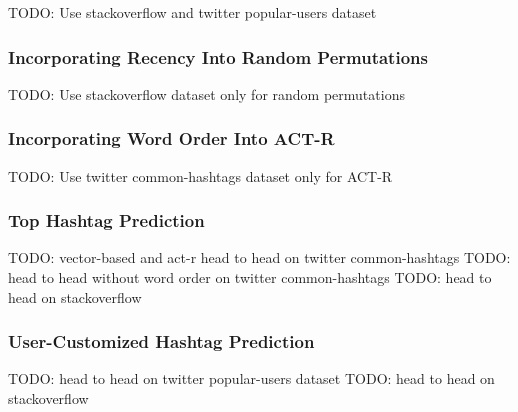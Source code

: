 \documentclass[man]{apa6}
\begin{document}
TODO: Use stackoverflow and twitter popular-users dataset

\subsubsection{Incorporating Recency Into Random Permutations}

TODO: Use stackoverflow dataset only for random permutations

\subsubsection{Incorporating Word Order Into ACT-R}

TODO: Use twitter common-hashtags dataset only for ACT-R

\subsubsection{Top Hashtag Prediction}

TODO: vector-based and act-r head to head on twitter common-hashtags
TODO: head to head without word order on twitter common-hashtags
TODO: head to head on stackoverflow

\subsubsection{User-Customized Hashtag Prediction}

TODO: head to head on twitter popular-users dataset
TODO: head to head on stackoverflow

\begingroup
{}
\setlength\bibitemsep{12pt}
\printbibliography
\endgroup
\end{document}
